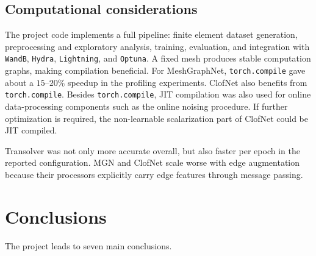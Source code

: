 \documentclass[11pt,a4paper,reqno]{amsart}
\theoremstyle{definition}
\theoremstyle{remark}
\numberwithin{equation}{section}
\begin{document}
\subsection{Computational considerations}

The project code implements a full pipeline: finite element dataset generation, preprocessing and exploratory analysis, training, evaluation, and integration with \texttt{WandB}, \texttt{Hydra}, \texttt{Lightning}, and \texttt{Optuna}. A fixed mesh produces stable computation graphs, making compilation beneficial. For MeshGraphNet, \texttt{torch.compile} gave about a $15$--$20\%$ speedup in the profiling experiments. ClofNet also benefits from \texttt{torch.compile}. Besides \texttt{torch.compile}, JIT compilation was also used for online data-processing components such as the online noising procedure. If further optimization is required, the non-learnable scalarization part of ClofNet could be JIT compiled.

Transolver was not only more accurate overall, but also faster per epoch in the reported configuration. MGN and ClofNet scale worse with edge augmentation because their processors explicitly carry edge features through message passing.

\section{Conclusions}\label{sec:conclusions}

The project leads to seven main conclusions. 
\end{document}
